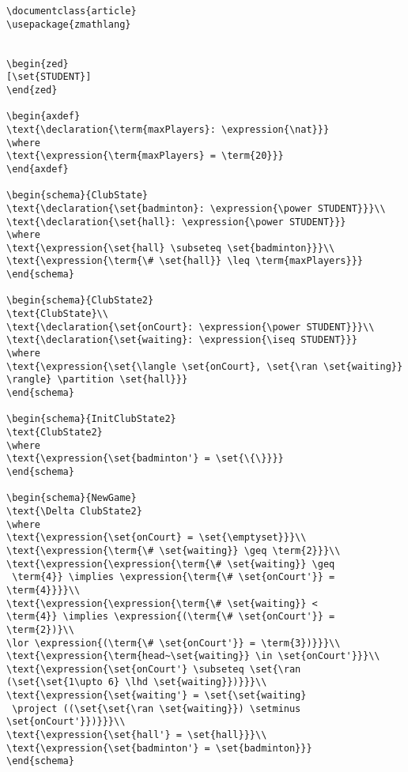 \begin{verbatim}
\documentclass{article}
\usepackage{zmathlang}


\begin{zed}
[\set{STUDENT}]
\end{zed}

\begin{axdef}
\text{\declaration{\term{maxPlayers}: \expression{\nat}}}
\where
\text{\expression{\term{maxPlayers} = \term{20}}}
\end{axdef}

\begin{schema}{ClubState}
\text{\declaration{\set{badminton}: \expression{\power STUDENT}}}\\
\text{\declaration{\set{hall}: \expression{\power STUDENT}}}
\where
\text{\expression{\set{hall} \subseteq \set{badminton}}}\\
\text{\expression{\term{\# \set{hall}} \leq \term{maxPlayers}}}
\end{schema}

\begin{schema}{ClubState2}
\text{ClubState}\\
\text{\declaration{\set{onCourt}: \expression{\power STUDENT}}}\\
\text{\declaration{\set{waiting}: \expression{\iseq STUDENT}}}
\where
\text{\expression{\set{\langle \set{onCourt}, \set{\ran \set{waiting}} 
\rangle} \partition \set{hall}}}
\end{schema}

\begin{schema}{InitClubState2}
\text{ClubState2}
\where
\text{\expression{\set{badminton'} = \set{\{\}}}}
\end{schema}

\begin{schema}{NewGame}
\text{\Delta ClubState2}
\where
\text{\expression{\set{onCourt} = \set{\emptyset}}}\\
\text{\expression{\term{\# \set{waiting}} \geq \term{2}}}\\
\text{\expression{\expression{\term{\# \set{waiting}} \geq
 \term{4}} \implies \expression{\term{\# \set{onCourt'}} = \term{4}}}}\\
\text{\expression{\expression{\term{\# \set{waiting}} < 
\term{4}} \implies \expression{(\term{\# \set{onCourt'}} = \term{2})}\\
\lor \expression{(\term{\# \set{onCourt'}} = \term{3})}}}\\
\text{\expression{\term{head~\set{waiting}} \in \set{onCourt'}}}\\
\text{\expression{\set{onCourt'} \subseteq \set{\ran 
(\set{\set{1\upto 6} \lhd \set{waiting}})}}}\\
\text{\expression{\set{waiting'} = \set{\set{waiting}
 \project ((\set{\set{\ran \set{waiting}}) \setminus \set{onCourt'}})}}}\\
\text{\expression{\set{hall'} = \set{hall}}}\\
\text{\expression{\set{badminton'} = \set{badminton}}}
\end{schema}


\end{verbatim}
